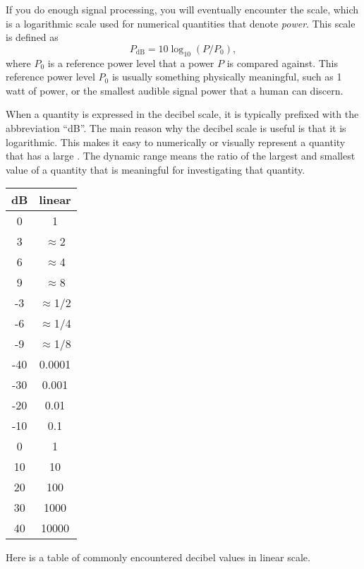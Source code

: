 If you do enough signal processing, you will eventually encounter the
 scale, which is a logarithmic scale used for numerical
quantities that denote \emph{power}. This scale is defined as
\begin{equation}
\boxed{
P_{\mathrm{dB}} = 10 \log_{10}(P/P_0),
}
\end{equation}
where $P_0$ is a reference power level that a power $P$ is compared
against. This reference power level $P_0$ is usually something
physically meaningful, such as 1 watt of power, or the smallest
audible signal power that a human can discern.

When a quantity is expressed in the decibel scale, it is typically
prefixed with the abbreviation ``dB''. The main reason why the decibel
scale is useful is that it is logarithmic. This makes it easy to
numerically or visually represent a quantity that has a
large \emph{}. The dynamic range
means the ratio of the largest and smallest value of a quantity that
is meaningful for investigating that quantity.
\begin{margintable}
\begin{center}
\begin{tabular}{c|c}
dB & linear \\
\hline
\hline
0 & 1 \\
3 & $\approx$2 \\
6 & $\approx$4 \\
9 & $\approx$8 \\
-3 & $\approx$1/2 \\
-6 & $\approx$1/4 \\
-9 & $\approx$1/8 \\
-40 & 0.0001 \\
-30 & 0.001 \\
-20 & 0.01 \\
-10 & 0.1 \\
0 & 1 \\
10 & 10 \\
20 & 100 \\
30 & 1000 \\
40 & 10000 
\end{tabular}
\end{center}
\caption{Here is a table of commonly encountered decibel values in linear scale.}
\end{margintable}



